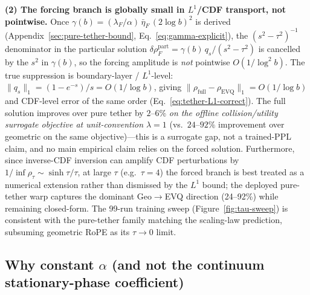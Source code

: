 \textbf{(2) The forcing branch is globally small in $L^1$/CDF transport, not pointwise.} Once $\gamma(b) = (\lambda_F/\alpha)\,\bar\eta_F\,(2\log b)^2$ is derived (Appendix~\ref{sec:pure-tether-bound}, Eq.~\eqref{eq:gamma-explicit}), the $(s^2{-}\tau^2)^{-1}$ denominator in the particular solution $\delta\rho_F^{\mathrm{part}} = \gamma(b)\,q_s/(s^2-\tau^2)$ is cancelled by the $s^2$ in $\gamma(b)$, so the forcing amplitude is \emph{not} pointwise $O(1/\log^2 b)$. The true suppression is boundary-layer / $L^1$-level: $\|q_s\|_1 = (1-e^{-s})/s = O(1/\log b)$, giving $\|\rho_{\mathrm{full}}-\rho_{\mathrm{EVQ}}\|_1 = O(1/\log b)$ and CDF-level error of the same order (Eq.~\eqref{eq:tether-L1-correct}). The full solution improves over pure tether by $2$--$6\%$ \emph{on the offline collision/utility surrogate objective at unit-convention $\lambda{=}1$} (vs.\ $24$--$92\%$ improvement over geometric on the same objective)---this is a surrogate gap, not a trained-PPL claim, and no main empirical claim relies on the forced solution. Furthermore, since inverse-CDF inversion can amplify CDF perturbations by $1/\inf\rho_\tau{\sim}\sinh\tau/\tau$, at large $\tau$ (e.g.\ $\tau{=}4$) the forced branch is best treated as a numerical extension rather than dismissed by the $L^1$ bound; the deployed pure-tether warp captures the dominant Geo$\to$EVQ direction (24--92\%) while remaining closed-form. The 99-run training sweep (Figure~\ref{fig:tau-sweep}) is consistent with the pure-tether family matching the scaling-law prediction, subsuming geometric RoPE as its $\tau{\to}0$ limit.

\subsection{Why constant \texorpdfstring{$\alpha$}{alpha} (and not the continuum stationary-phase coefficient)}
\label{sec:why-constant-alpha}

